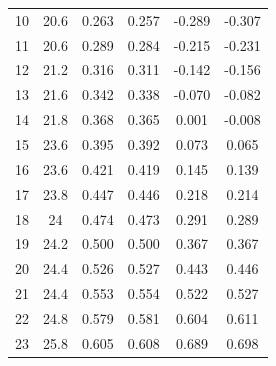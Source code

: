 \begin{table}[H]
\begin{tabular}{cccccc}
    10         & 20.6                      & 0.263                      & 0.257                       & -0.289                  & -0.307                  \\
    11         & 20.6                      & 0.289                      & 0.284                       & -0.215                  & -0.231                  \\
    12         & 21.2                      & 0.316                      & 0.311                       & -0.142                  & -0.156                  \\
    13         & 21.6                      & 0.342                      & 0.338                       & -0.070                  & -0.082                  \\
    14         & 21.8                      & 0.368                      & 0.365                       & 0.001                   & -0.008                  \\
    15         & 23.6                      & 0.395                      & 0.392                       & 0.073                   & 0.065                   \\
    16         & 23.6                      & 0.421                      & 0.419                       & 0.145                   & 0.139                   \\
    17         & 23.8                      & 0.447                      & 0.446                       & 0.218                   & 0.214                   \\
    18         & 24                        & 0.474                      & 0.473                       & 0.291                   & 0.289                   \\
    19         & 24.2                      & 0.500                      & 0.500                       & 0.367                   & 0.367                   \\
    20         & 24.4                      & 0.526                      & 0.527                       & 0.443                   & 0.446                   \\
    21         & 24.4                      & 0.553                      & 0.554                       & 0.522                   & 0.527                   \\
    22         & 24.8                      & 0.579                      & 0.581                       & 0.604                   & 0.611                   \\
    23         & 25.8                      & 0.605                      & 0.608                       & 0.689                   & 0.698                   \\

\end{tabular}
\end{table}
